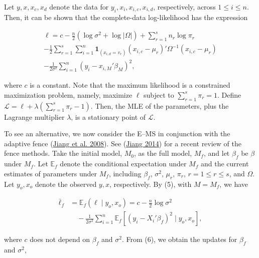 \documentclass[
  12pt,
]{article}
\begin{document}
Let \(y, x, x_c, x_d\) denote the data for
\(y_i, x_i, x_{i,c}, x_{i,d}\), respectively, across \(1 \le i \le n\).
Then, it can be shown that the complete-data log-likelihood has the
expression

\begin{equation}
\begin{aligned}
\ell = c - \frac{n}{2} (\log \sigma^2 + \log |\Omega|)
+ \sum_{r=1}^{s} n_r \log \pi_r \\
- \frac{1}{2} \sum_{r=1}^{s} \sum_{i=1}^{n} \mathbf{1}_{(x_{i,d} = v_r)} (x_{i,c} - \mu_r)' \Omega^{-1} (x_{i,c} - \mu_r) \\
- \frac{1}{2 \sigma^2} \sum_{i=1}^{n} (y_i - x_{i,M}' \beta_M)^2,
\end{aligned}
\tag{5}
\end{equation}

where \(c\) is a constant. Note that the maximum likelihood is a
constrained maximization problem, namely, maximize \(\ell\) subject to
\(\sum_{r=1}^{s} \pi_r = 1.\) Define
\(\mathcal{L} = \ell + \lambda \left( \sum_{r=1}^{s} \pi_r - 1 \right).\)
Then, the MLE of the parameters, plus the Lagrange multiplier
\(\lambda\), is a stationary point of \(\mathcal{L}\).

To see an alternative, we now consider the E--MS in conjunction with the
adaptive fence (\protect\hyperlink{ref-Jiang_2008}{Jiang et al. 2008}).
See (\protect\hyperlink{ref-Jiang2014FenceMethods}{Jiang 2014}) for a
recent review of the fence methods. Take the initial model, \(M_0\), as
the full model, \(M_f\), and let \(\beta_f\) be \(\beta\) under \(M_f\).
Let \(\mathbb{E}_f\) denote the conditional expectation under \(M_f\)
and the current estimates of parameters under \(M_f\), including
\(\beta_f\), \(\sigma^2\), \(\mu_r\), \(\pi_r\), \(r = 1 \le r \le s\),
and \(\Omega\). Let \(y_o, x_o\) denote the observed \(y, x\),
respectively. By (5), with \(M = M_f\), we have

\begin{equation}
\begin{aligned}
\bar{\ell}_f
&= \mathbb{E}_f(\ell \mid y_o, x_o)
= c - \frac{n}{2} \log \sigma^2 \\
&\quad - \frac{1}{2\sigma^2} \sum_{i=1}^{n}
\mathbb{E}_f \!\left[ (y_i - X_i' \beta_f)^2 \mid y_o, x_o \right],
\end{aligned}
\tag{6}
\end{equation}

where \(c\) does not depend on \(\beta_f\) and \(\sigma^2\). From (6),
we obtain the updates for \(\beta_f\) and \(\sigma^2\),
\end{document}
